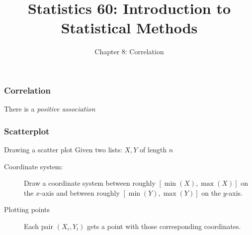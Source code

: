\documentclass[handout]{beamer}
\title{Statistics 60: Introduction to Statistical Methods}
\subtitle{Chapter 8: Correlation}
\author{}%
\begin{document}
   \begin{frame}
   \titlepage
   \end{frame}



   \begin{frame}
   \frametitle{Correlation}
   \begin{center}
   \end{center}
   There is a {\em positive association}
   \end{frame}


   \begin{frame} \frametitle{Scatterplot}

   \begin{block}
   {Drawing a scatter plot}
   Given two lists: $X, Y$ of length $n$
   \begin{description}
   \item[Coordinate system:] Draw a coordinate system
   between roughly $[\min(X), \max(X)]$ on the $x$-axis and
   between roughly $[\min(Y), \max(Y)]$ on the $y$-axis.

   \item[Plotting points] Each pair $(X_i, Y_i)$ gets a point
   with those corresponding coordinates.
   \end{description}
   \end{block}
   \end{frame}

\end{document}
